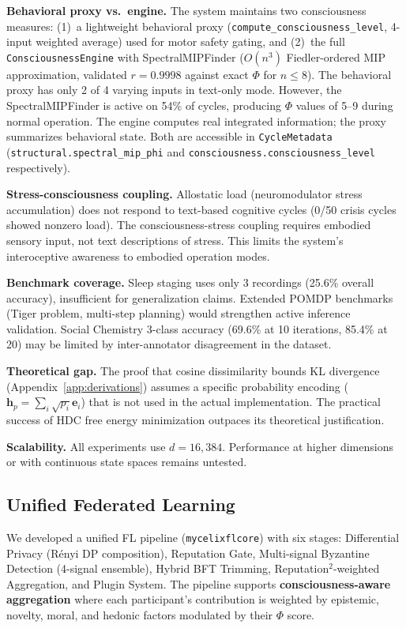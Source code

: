 \documentclass[10pt,letterpaper]{article}
\renewcommand{\Phi}{\varPhi}
\begin{document}
\textbf{Behavioral proxy vs.\ engine.} The system maintains two consciousness measures: (1)~a lightweight behavioral proxy (\texttt{compute\_consciousness\_level}, 4-input weighted average) used for motor safety gating, and (2)~the full \texttt{ConsciousnessEngine} with SpectralMIPFinder ($O(n^3)$ Fiedler-ordered MIP approximation, validated $r=0.9998$ against exact $\Phi$ for $n \leq 8$). The behavioral proxy has only 2 of 4 varying inputs in text-only mode. However, the SpectralMIPFinder is active on 54\% of cycles, producing $\Phi$ values of 5--9 during normal operation. The engine computes real integrated information; the proxy summarizes behavioral state. Both are accessible in \texttt{CycleMetadata} (\texttt{structural.spectral\_mip\_phi} and \texttt{consciousness.consciousness\_level} respectively).

\textbf{Stress-consciousness coupling.} Allostatic load (neuromodulator stress accumulation) does not respond to text-based cognitive cycles (0/50 crisis cycles showed nonzero load). The consciousness-stress coupling requires embodied sensory input, not text descriptions of stress. This limits the system's interoceptive awareness to embodied operation modes.

\textbf{Benchmark coverage.} Sleep staging uses only 3 recordings (25.6\% overall accuracy), insufficient for generalization claims. Extended POMDP benchmarks (Tiger problem, multi-step planning) would strengthen active inference validation. Social Chemistry 3-class accuracy (69.6\% at 10 iterations, 85.4\% at 20) may be limited by inter-annotator disagreement in the dataset.

\textbf{Theoretical gap.} The proof that cosine dissimilarity bounds KL divergence (Appendix~\ref{app:derivations}) assumes a specific probability encoding ($\mathbf{h}_p = \sum_i \sqrt{p_i} \mathbf{e}_i$) that is not used in the actual implementation. The practical success of HDC free energy minimization outpaces its theoretical justification.

\textbf{Scalability.} All experiments use $d = 16{,}384$. Performance at higher dimensions or with continuous state spaces remains untested.

\subsection{Unified Federated Learning}
\label{sec:fl}

We developed a unified FL pipeline (\texttt{mycelix\-fl\-core}) with six stages: Differential Privacy (R\'{e}nyi DP composition), Reputation Gate, Multi-signal Byzantine Detection (4-signal ensemble), Hybrid BFT Trimming, Reputation$^2$-weighted Aggregation, and Plugin System. The pipeline supports \textbf{consciousness-aware aggregation} where each participant's contribution is weighted by epistemic, novelty, moral, and hedonic factors modulated by their $\Phi$ score.
\end{document}
